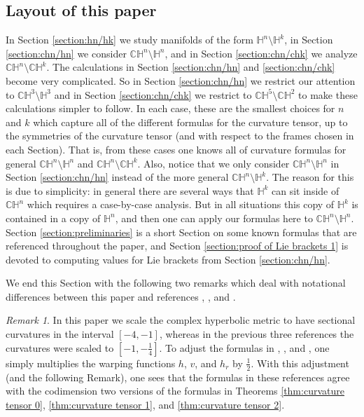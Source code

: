 \documentclass[10pt]{amsart}
\def\-1/4{- \frac{1}{4}}
\def\H{\mathbb{H}}
\def\C{\mathbb{C}}
\theoremstyle{definition}
\theoremstyle{remark}
\newtheorem{remark}[theorem]{Remark}
\numberwithin{equation}{section}
\begin{document}
\subsection{Layout of this paper}
In Section \ref{section:hn/hk} we study manifolds of the form $\H^n \setminus \H^k$, in Section \ref{section:chn/hn} we consider $\C \H^n \setminus \H^n$, and in Section \ref{section:chn/chk} we analyze $\C \H^n \setminus \C \H^k$.    
The calculations in Section \ref{section:chn/hn} and \ref{section:chn/chk} become very complicated.
So in Section \ref{section:chn/hn} we restrict our attention to $\C \H^3 \setminus \H^3$ and in Section \ref{section:chn/chk} we restrict to $\C \H^5 \setminus \C \H^2$ to make these calculations simpler to follow.  
In each case, these are the smallest choices for $n$ and $k$ which capture all of the different formulas for the curvature tensor, up to the symmetries of the curvature tensor (and with respect to the frames chosen in each Section).
That is, from these cases one knows all of curvature formulas for general $\C \H^n \setminus \H^n$ and $\C \H^n \setminus \C \H^k$.
Also, notice that we only consider $\C \H^n \setminus \H^n$ in Section \ref{section:chn/hn} instead of the more general $\C \H^n \setminus \H^k$.  
The reason for this is due to simplicity:  in general there are several ways that $\H^k$ can sit inside of $\C \H^n$ which requires a case-by-case analysis.  
But in all situations this copy of $\H^k$ is contained in a copy of $\H^n$, and then one can apply our formulas here to $\C \H^n \setminus \H^n$.
Section \ref{section:preliminaries} is a short Section on some known formulas that are referenced throughout the paper, and Section \ref{section:proof of Lie brackets 1} is devoted to computing values for Lie brackets from Section \ref{section:chn/hn}.

We end this Section with the following two remarks which deal with notational differences between this paper and references \cite{Belegradek real}, \cite{Belegradek complex}, and \cite{Min}.

\begin{remark}\label{rmk:curvature bounds}
In this paper we scale the complex hyperbolic metric to have sectional curvatures in the interval $[-4,-1]$, whereas in the previous three references the curvatures were scaled to $\left[ -1,\-1/4 \right]$.  
To adjust the formulas in \cite{Belegradek real}, \cite{Belegradek complex}, and \cite{Min}, one simply multiplies the warping functions $h$, $v$, and $h_r$ by $\frac{1}{2}$.  
With this adjustment (and the following Remark), one sees that the formulas in these references agree with the codimension two versions of the formulas in Theorems \ref{thm:curvature tensor 0}, \ref{thm:curvature tensor 1}, and \ref{thm:curvature tensor 2}.
\end{remark}
\end{document}
